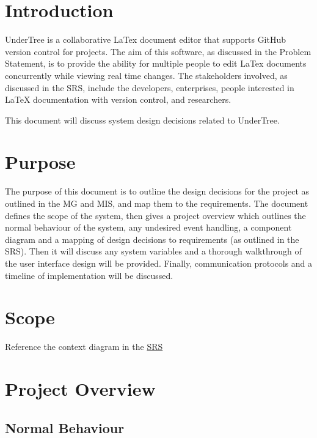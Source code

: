 \documentclass[12pt, titlepage]{article}
\begin{document}
	\tableofcontents
	
	\newpage
	
	\listoftables
	
	\listoffigures
	
	\newpage
	
	
	\section{Introduction}
	UnderTree is a collaborative LaTex document editor that supports GitHub version control for projects. The aim of this software, as discussed in the Problem Statement, is to provide the ability for multiple people to edit LaTex documents concurrently while viewing real time changes. The stakeholders involved, as discussed in the SRS, include the developers, enterprises, people interested in LaTeX documentation with version control, and researchers.
	
	This document will discuss system design decisions related to UnderTree.
	
	\section{Purpose}
	The purpose of this document is to outline the design decisions for the project as outlined in the MG and MIS, and map them to the requirements. The document defines the scope of the system, then gives a project overview which outlines the normal behaviour of the system, any undesired event handling, a component diagram and a mapping of design decisions to requirements (as outlined in the SRS). Then it will discuss any system variables and a thorough walkthrough of the user interface design will be provided. Finally, communication protocols and a timeline of implementation will be discussed.
	
	\section{Scope}
	
	Reference the context diagram in the \href{https://github.com/RutheniumVI/UnderTree/blob/main/docs/SRS/SRS.pdf}{SRS}
	
	\section{Project Overview}
	
	\subsection{Normal Behaviour}
	
\end{document}
